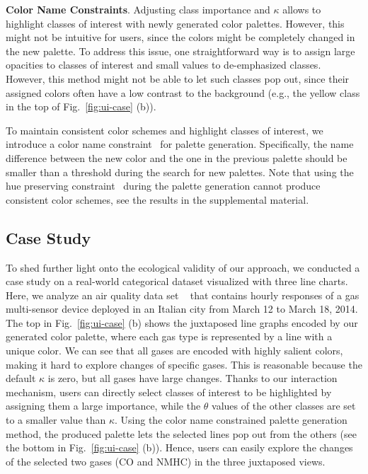 \vspace{1.5mm}
\noindent\textbf{Color Name Constraints}.
Adjusting class importance and $\kappa$  allows to highlight  classes of interest with newly generated color palettes. However, this might not be intuitive for users, since the colors might be completely changed in the new palette. To address this issue,
one straightforward way is to  assign large opacities  to classes of interest and small values to de-emphasized classes. However, this method might not be able to let such classes pop out, since their assigned colors often have a low contrast to the background (e.g., the yellow class in the top of Fig.~\ref{fig:ui-case} (b)).

To maintain consistent color schemes and highlight classes of interest, we introduce a color name constraint~\cite{heer2012color} for palette generation. Specifically, the name difference between the new color and the one in the previous palette should be smaller than a threshold during the search for new palettes. 
Note that using the hue preserving constraint~\cite{chuang2009hue} during the palette generation cannot produce consistent color schemes, see the results in the supplemental material.

\subsection{Case Study}
\label{sec:caseStudy}



To shed further light onto the ecological validity of our approach, we conducted a case study on a real-world categorical dataset visualized with three line charts.
Here, we analyze an air quality data set ~\cite{DEVITO2008750} that contains hourly responses of a gas multi-sensor device deployed in an Italian city from March 12 to March 18, 2014.
The top in Fig.~\ref{fig:ui-case} (b) shows the juxtaposed line graphs encoded by our generated color palette, where each gas type is represented by a line with a unique color.
We can see that all gases are encoded with highly salient colors, making it hard to explore changes of specific gases. This is reasonable because the default $\kappa$ is zero, but all gases have large changes.
Thanks to our interaction mechanism, users can directly select classes of interest to be highlighted by assigning them a large importance, while  the $\theta$ values of the other classes are set to a smaller value than $\kappa$. Using the color name constrained palette generation method, the produced palette lets the selected lines pop out from the others (see the bottom in Fig.~\ref{fig:ui-case} (b)). Hence, users can easily explore the changes of the selected two gases (CO and NMHC) in the three juxtaposed views.


